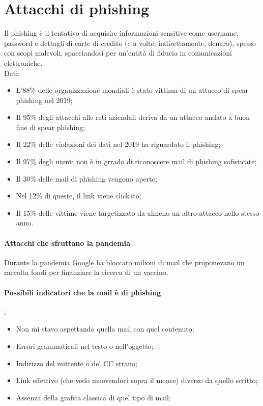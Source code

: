 \section{Attacchi di phishing}
Il phishing è il tentativo di acquisire informazioni sensitive come username, password e dettagli di carte di credito (e a volte, indirettamente, denaro), spesso con scopi malevoli, spacciandosi per un'entità di fiducia in comunicazioni elettroniche.
\\

\noindent Dati:
\begin{itemize}
    \item L'88\% delle organizzazione mondiali è stato vittima di un attacco di spear phishing nel 2019;
    \item Il 95\% degli attacchi alle reti aziendali deriva da un attacco andato a buon fine di spear phishing;
    \item Il 22\% delle violazioni dei dati nel 2019 ha riguardato il phishing;
    \item Il 97\% degli utenti non è in grrado di riconoscere mail di phishing sofisticate;
    \item Il 30\% delle mail di phishing vengono aperte;
    \item Nel 12\% di queste, il link viene clickato;
    \item Il 15\% delle vittime viene targetizzato da almeno un altro attacco nello stesso anno.
\end{itemize}

\paragraph{Attacchi che sfruttano la pandemia} Durante la pandemia Google ha bloccato milioni di mail che proponevano un raccolta fondi per finanziare la ricerca di un vaccino.

\paragraph{Possibili indicatori che la mail è di phishing}:
\begin{itemize}
    \item Non mi stavo aspettando quella mail con quel contenuto;
    \item Errori grammaticali nel testo o nell'oggetto;
    \item Indirizzo del mittente o del CC strano;
    \item Link effettivo (che vedo muovendoci sopra il mouse) diverso da quello scritto;
    \item Assenza della grafica classica di quel tipo di mail;
\end{itemize}

